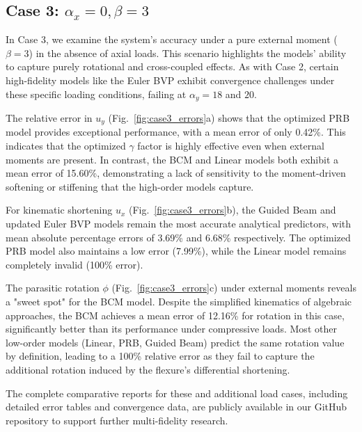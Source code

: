 \documentclass[colorlinks,upint,subscriptcorrection,varvw,hyphenate,balance]{asmeconf} %
\begin{document}
\subsection{Case 3: \texorpdfstring{$\alpha_x = 0, \beta = 3$}{alpha_x = 0, beta = 3}}
\label{sec:case3}
In Case 3, we examine the system's accuracy under a pure external moment ($\beta = 3$) in the absence of axial loads. This scenario highlights the models' ability to capture purely rotational and cross-coupled effects. As with Case 2, certain high-fidelity models like the Euler BVP exhibit convergence challenges under these specific loading conditions, failing at $\alpha_y = 18$ and $20$.

The relative error in $u_y$ (Fig.~\ref{fig:case3_errors}a) shows that the optimized PRB model provides exceptional performance, with a mean error of only 0.42\%. This indicates that the optimized $\gamma$ factor is highly effective even when external moments are present. In contrast, the BCM and Linear models both exhibit a mean error of 15.60\%, demonstrating a lack of sensitivity to the moment-driven softening or stiffening that the high-order models capture.

For kinematic shortening $u_x$ (Fig.~\ref{fig:case3_errors}b), the Guided Beam and updated Euler BVP models remain the most accurate analytical predictors, with mean absolute percentage errors of 3.69\% and 6.68\% respectively. The optimized PRB model also maintains a low error (7.99\%), while the Linear model remains completely invalid (100\% error).

The parasitic rotation $\phi$ (Fig.~\ref{fig:case3_errors}c) under external moments reveals a "sweet spot" for the BCM model. Despite the simplified kinematics of algebraic approaches, the BCM achieves a mean error of 12.16\% for rotation in this case, significantly better than its performance under compressive loads. Most other low-order models (Linear, PRB, Guided Beam) predict the same rotation value by definition, leading to a 100\% relative error as they fail to capture the additional rotation induced by the flexure's differential shortening.

The complete comparative reports for these and additional load cases, including detailed error tables and convergence data, are publicly available in our GitHub repository \cite{GitHubRepo} to support further multi-fidelity research.
\end{document}
